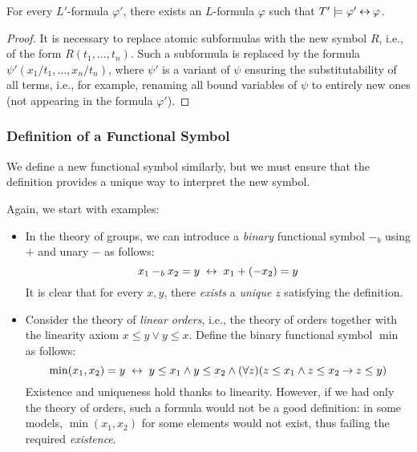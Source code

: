 \begin{proposition}
    For every $L'$-formula $\varphi'$, there exists an $L$-formula $\varphi$ such that $T'\models\varphi'\mathbin{\leftrightarrow}\varphi$.
\end{proposition}
\begin{proof}
    It is necessary to replace atomic subformulas with the new symbol $R$, i.e., of the form $R(t_1,\dots,t_n)$. Such a subformula is replaced by the formula $\psi'(x_1/t_1,\dots,x_n/t_n)$, where $\psi'$ is a variant of $\psi$ ensuring the substitutability of all terms, i.e., for example, renaming all bound variables of $\psi$ to entirely new ones (not appearing in the formula $\varphi'$).
\end{proof}

\subsubsection*{Definition of a Functional Symbol}

We define a new functional symbol similarly, but we must ensure that the definition provides a unique way to interpret the new symbol.

\begin{example}
    Again, we start with examples:
    \begin{itemize}
        \item In the theory of groups, we can introduce a \emph{binary} functional symbol $-_b$ using $+$ and unary $-$ as follows:
        $$
        x_1 -_b x_2 = y\ \mathbin{\leftrightarrow}\ x_1 + (-x_2) = y
        $$
        It is clear that for every $x, y$, there \emph{exists} a \emph{unique} $z$ satisfying the definition.
        \item Consider the theory of \emph{linear orders}, i.e., the theory of orders together with the linearity axiom $x\leq y\lor y\leq x$. Define the binary functional symbol $\min$ as follows:
        $$
        \min(x_1,x_2)=y\ \mathbin{\leftrightarrow}\ y\leq x_1\land y\leq x_2\land (\forall z)(z\leq x_1\land z\leq x_2\mathbin{\rightarrow} z\leq y)
        $$
        Existence and uniqueness hold thanks to linearity. However, if we had only the theory of orders, such a formula would not be a good definition: in some models, $\min(x_1,x_2)$ for some elements would not exist, thus failing the required \emph{existence}.
    \end{itemize}
\end{example}

